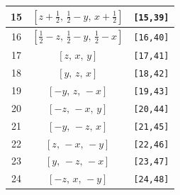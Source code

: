 \documentclass[fleqn,8pt]{jsarticle}
\begin{document}
\begin{longtable}{ccc}
15 & $\left[ z + \frac{1}{2},\, \frac{1}{2} - y,\, x + \frac{1}{2} \right]$ & {\tt [15,39]} \\ \hline
16 & $\left[ \frac{1}{2} - z,\, \frac{1}{2} - y,\, \frac{1}{2} - x \right]$ & {\tt [16,40]} \\ \hline
17 & $\left[ z,\, x,\, y \right]$ & {\tt [17,41]} \\ \hline
18 & $\left[ y,\, z,\, x \right]$ & {\tt [18,42]} \\ \hline
19 & $\left[ - y,\, z,\, - x \right]$ & {\tt [19,43]} \\ \hline
20 & $\left[ - z,\, - x,\, y \right]$ & {\tt [20,44]} \\ \hline
21 & $\left[ - y,\, - z,\, x \right]$ & {\tt [21,45]} \\ \hline
22 & $\left[ z,\, - x,\, - y \right]$ & {\tt [22,46]} \\ \hline
23 & $\left[ y,\, - z,\, - x \right]$ & {\tt [23,47]} \\ \hline
24 & $\left[ - z,\, x,\, - y \right]$ & {\tt [24,48]} \\
\end{longtable}
\end{document}
